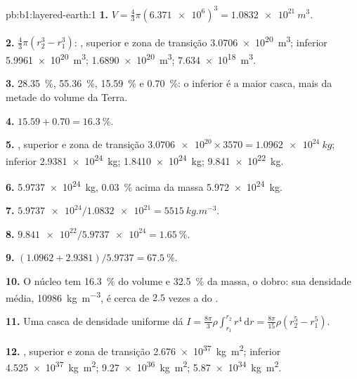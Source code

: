 \begin{solution}{pb:b1:layered-earth:1}
\textbf{1.} $V = \tfrac43\pi(\num{6.371e6})^3 = \qty{1.0832e21}{m^3}$.

\textbf{2.} $\tfrac43\pi(r_2^3 - r_1^3)$: ,  superior e zona de transição
\qty{3.0706e20}{m^3};  inferior \qty{5.9961e20}{m^3}; 
\qty{1.6890e20}{m^3};  \qty{7.634e18}{m^3}.

\textbf{3.} \qty{28.35}{\percent}, \qty{55.36}{\percent}, \qty{15.59}{\percent}
e \qty{0.70}{\percent}: o  inferior é a maior casca, mais da metade
do volume da Terra.

\textbf{4.} $15.59 + 0.70 = \qty{16.3}{\percent}$.

\textbf{5.} ,  superior e zona de transição $\num{3.0706e20}\times3570 =
\qty{1.0962e24}{kg}$;  inferior \qty{2.9381e24}{kg}; 
\qty{1.8410e24}{kg};  \qty{9.841e22}{kg}.

\textbf{6.} \qty{5.9737e24}{kg}, \qty{0.03}{\percent} acima da massa
\qty{5.972e24}{kg}.

\textbf{7.} $\num{5.9737e24}/\num{1.0832e21} = \qty{5515}{kg.m^{-3}}$.

\textbf{8.} $\num{9.841e22}/\num{5.9737e24} = \qty{1.65}{\percent}$.

\textbf{9.} $(1.0962 + 2.9381)/5.9737 = \qty{67.5}{\percent}$.

\textbf{10.} O núcleo tem \qty{16.3}{\percent} do volume e
\qty{32.5}{\percent} da massa, o dobro: sua densidade média,
\qty{10986}{kg.m^{-3}}, é cerca de $2.5$ vezes a do .

\textbf{11.} Uma casca de densidade uniforme dá
$I = \tfrac{8\pi}{3}\rho\int_{r_1}^{r_2} r^4\,\mathrm dr = \tfrac{8\pi}{15}\rho
(r_2^5 - r_1^5)$.

\textbf{12.} ,  superior e zona de transição \qty{2.676e37}{kg.m^2};  inferior
\qty{4.525e37}{kg.m^2};  \qty{9.27e36}{kg.m^2}; 
\qty{5.87e34}{kg.m^2}.


\end{solution}
